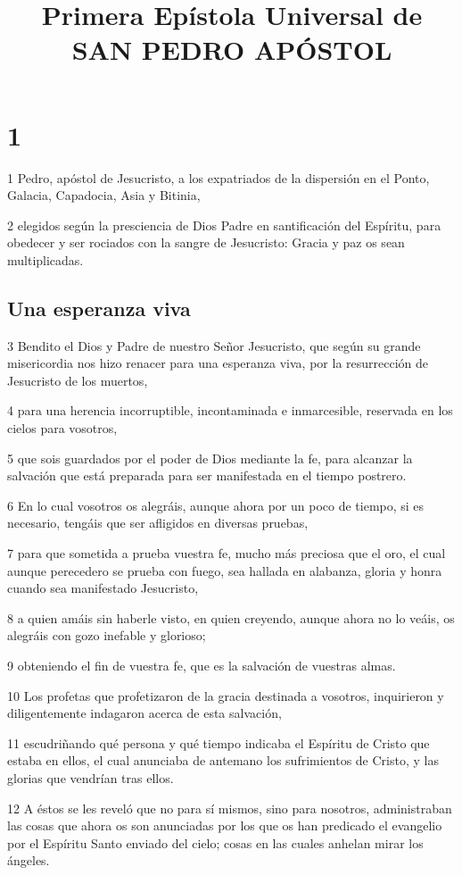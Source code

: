 
\title{Primera Epístola Universal de SAN PEDRO APÓSTOL}

\chapter{1}

\par 1 Pedro, apóstol de Jesucristo, a los expatriados de la dispersión en el Ponto, Galacia, Capadocia, Asia y Bitinia,
\par 2 elegidos según la presciencia de Dios Padre en santificación del Espíritu, para obedecer y ser rociados con la sangre de Jesucristo: Gracia y paz os sean multiplicadas.

\section*{Una esperanza viva}

\par 3 Bendito el Dios y Padre de nuestro Señor Jesucristo, que según su grande misericordia nos hizo renacer para una esperanza viva, por la resurrección de Jesucristo de los muertos,
\par 4 para una herencia incorruptible, incontaminada e inmarcesible, reservada en los cielos para vosotros,
\par 5 que sois guardados por el poder de Dios mediante la fe, para alcanzar la salvación que está preparada para ser manifestada en el tiempo postrero.
\par 6 En lo cual vosotros os alegráis, aunque ahora por un poco de tiempo, si es necesario, tengáis que ser afligidos en diversas pruebas,
\par 7 para que sometida a prueba vuestra fe, mucho más preciosa que el oro, el cual aunque perecedero se prueba con fuego, sea hallada en alabanza, gloria y honra cuando sea manifestado Jesucristo,
\par 8 a quien amáis sin haberle visto, en quien creyendo, aunque ahora no lo veáis, os alegráis con gozo inefable y glorioso;
\par 9 obteniendo el fin de vuestra fe, que es la salvación de vuestras almas.
\par 10 Los profetas que profetizaron de la gracia destinada a vosotros, inquirieron y diligentemente indagaron acerca de esta salvación,
\par 11 escudriñando qué persona y qué tiempo indicaba el Espíritu de Cristo que estaba en ellos, el cual anunciaba de antemano los sufrimientos de Cristo, y las glorias que vendrían tras ellos.
\par 12 A éstos se les reveló que no para sí mismos, sino para nosotros, administraban las cosas que ahora os son anunciadas por los que os han predicado el evangelio por el Espíritu Santo enviado del cielo; cosas en las cuales anhelan mirar los ángeles.

